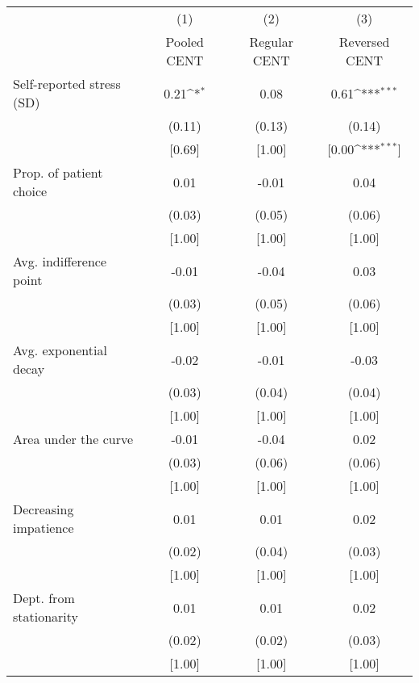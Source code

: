 {
\def\sym#1{\ifmmode^{#1}\else\(^{#1}\)\fi}
\begin{tabular}{l*{3}{c}}
\toprule
          &\multicolumn{1}{c}{(1)}&\multicolumn{1}{c}{(2)}&\multicolumn{1}{c}{(3)}\\
          &\multicolumn{1}{c}{Pooled CENT}&\multicolumn{1}{c}{Regular CENT}&\multicolumn{1}{c}{Reversed CENT}\\
\midrule
Self-reported stress (SD)&0.21\sym{*}&     0.08&0.61\sym{***}\\
          &   (0.11)&   (0.13)&   (0.14)\\
          &   [0.69]&   [1.00]&[0.00\sym{***}]\\
Prop. of patient choice&     0.01&    -0.01&     0.04\\
          &   (0.03)&   (0.05)&   (0.06)\\
          &   [1.00]&   [1.00]&   [1.00]\\
Avg. indifference point&    -0.01&    -0.04&     0.03\\
          &   (0.03)&   (0.05)&   (0.06)\\
          &   [1.00]&   [1.00]&   [1.00]\\
Avg. exponential decay&    -0.02&    -0.01&    -0.03\\
          &   (0.03)&   (0.04)&   (0.04)\\
          &   [1.00]&   [1.00]&   [1.00]\\
Area under the curve&    -0.01&    -0.04&     0.02\\
          &   (0.03)&   (0.06)&   (0.06)\\
          &   [1.00]&   [1.00]&   [1.00]\\
Decreasing impatience&     0.01&     0.01&     0.02\\
          &   (0.02)&   (0.04)&   (0.03)\\
          &   [1.00]&   [1.00]&   [1.00]\\
Dept. from stationarity&     0.01&     0.01&     0.02\\
          &   (0.02)&   (0.02)&   (0.03)\\
          &   [1.00]&   [1.00]&   [1.00]\\
\bottomrule
\end{tabular}
}
